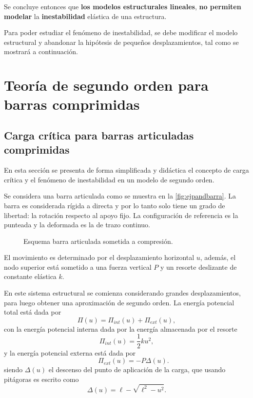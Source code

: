 Se concluye entonces que \textbf{los modelos estructurales lineales}, \textbf{no permiten modelar} la \textbf{inestabilidad} elástica de una estructura. %

Para poder estudiar el fenómeno de inestabilidad, se debe modificar el modelo estructural y abandonar la hipótesis de pequeños desplazamientos, tal como se mostrará a continuación.
 



\section{Teoría de segundo orden para barras comprimidas}


\subsection{Carga crítica para barras articuladas comprimidas} \label{sec:pand_barra}
En esta sección se presenta de forma simplificada y didáctica el concepto de carga crítica y el fenómeno de inestabilidad en un modelo de segundo orden.

Se considera una barra articulada como se muestra en la \autoref{fig:ejpandbarra}. La barra  es considerada rígida a directa y por lo tanto solo tiene un grado de libertad: la rotación respecto al apoyo fijo. La configuración de referencia es la punteada y la deformada es la de trazo continuo. 

\begin{figure}[htb]
	\centering
\def\svgwidth{.55\textwidth}

\caption{Esquema barra articulada sometida a compresión.}\label{fig:ejpandbarra}
\end{figure}

El movimiento es determinado por el desplazamiento horizontal $u$, además, el nodo superior está sometido a una fuerza vertical $P$ y un resorte deslizante de constante elástica $k$.

En este sistema estructural se comienza considerando grandes desplazamientos, para luego obtener una aproximación de segundo orden. La energía potencial total está dada por
$$
\Pi(u) = \Pi_{int}(u) + \Pi_{ext}(u),
$$
con la energía potencial interna dada por la energía almacenada por el resorte
$$
\Pi_{int}(u) = \frac{1}{2} k u^2,
$$
y  la energía potencial externa está dada por
$$
 \qquad \Pi_{ext}(u) = - P \Delta(u).
$$
siendo $\Delta(u)$ el descenso del punto de aplicación de la carga, que usando pitágoras es escrito como
$$
\Delta(u) = \ell - \sqrt{\ell^2 - u^2}.
$$

